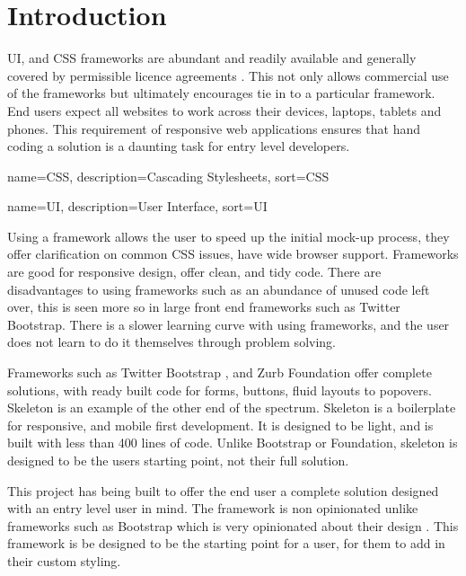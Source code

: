 \newpage
\chapter*{Introduction}

%
%

\gls{UI}, and \gls{CSS} frameworks are abundant and readily available and generally covered by permissible licence agreements \citep{CODY16}. This not only allows commercial use of the frameworks but ultimately encourages tie in to a particular framework. End users expect all websites to work across their devices, laptops, tablets and phones. This requirement of responsive web applications ensures that hand coding a solution is a daunting task for entry level developers.




%
{
  name={CSS},
  description={Cascading Stylesheets},
  sort=CSS
}
%


%
{
  name={UI},
  description={User Interface},
  sort=UI
}
%

Using a framework allows the user to speed up the initial mock-up process, they offer clarification on common \gls{CSS} issues, have wide browser support. Frameworks are good for responsive design, offer clean, and tidy code. There are disadvantages to using frameworks such as an abundance of unused code left over, this is seen more so in large front end frameworks such as Twitter Bootstrap. There is a slower learning curve with using frameworks, and the user does not learn to do it themselves through problem solving. 

Frameworks such as Twitter Bootstrap \citep{SASS16}, and Zurb Foundation \citep{LESS16} offer complete solutions, with ready built code for forms, buttons, fluid layouts to popovers. Skeleton \citep{SKEL16} is an example of the other end of the spectrum. Skeleton is a boilerplate for responsive, and mobile first development. It is designed to be light, and is built with less than 400 lines of code. Unlike Bootstrap or Foundation, skeleton is designed to be the users starting point, not their full solution. 

This project has being built to offer the end user a complete solution designed with an entry level user in mind. The framework is non opinionated unlike frameworks such as Bootstrap which is very opinionated about their design \citet{KEMH16}. This framework is be designed to be the starting point for a user, for them to add in their custom styling. 

